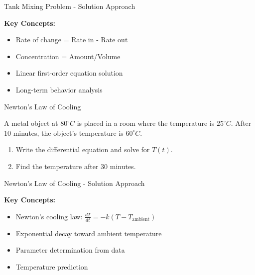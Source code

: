 \documentclass[10pt,aspectratio=169]{beamer}
\begin{document}
\begin{frame}{Tank Mixing Problem - Solution Approach}
    \begin{solutionbox}
        \textbf{Key Concepts:}
        \begin{itemize}
            \item Rate of change = Rate in - Rate out
            \item Concentration = Amount/Volume  
            \item Linear first-order equation solution
            \item Long-term behavior analysis
        \end{itemize}
    \end{solutionbox}
\end{frame}

\begin{frame}{Newton's Law of Cooling}
    \begin{problembox}
        A metal object at $80^\circ C$ is placed in a room where the temperature is $25^\circ C$. After 10 minutes, the object's temperature is $60^\circ C$.
        \begin{enumerate}
            \item Write the differential equation and solve for $T(t)$.
            \item Find the temperature after 30 minutes.
        \end{enumerate}
    \end{problembox}
\end{frame}

\begin{frame}{Newton's Law of Cooling - Solution Approach}
    \begin{solutionbox}
        \textbf{Key Concepts:}
        \begin{itemize}
            \item Newton's cooling law: $\frac{dT}{dt} = -k(T - T_{\text{ambient}})$
            \item Exponential decay toward ambient temperature
            \item Parameter determination from data
            \item Temperature prediction
        \end{itemize}
    \end{solutionbox}
\end{frame}

\end{document}
